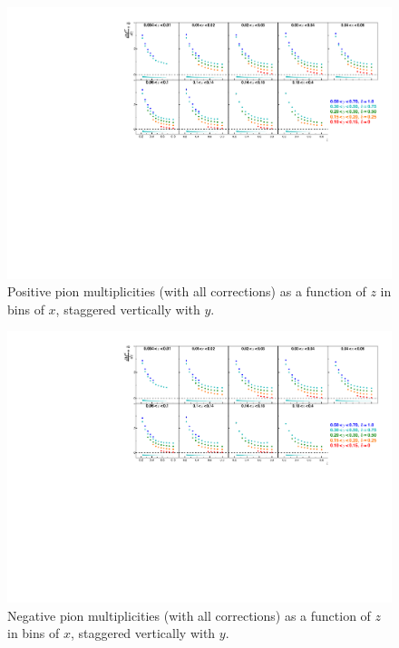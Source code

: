 \begin{figure}[!h]
  \centering
	\includegraphics[scale=0.85]{./gfx/pip.pdf}
	\caption{Positive pion multiplicities (with all corrections) as a function of $z$ in bins of $x$, staggered vertically with $y$.}
	\label{pic:mpip}
\end{figure}

\newpage

\begin{figure}[!h]
  \centering
	\includegraphics[scale=0.85]{./gfx/pim.pdf}
	\caption{Negative pion multiplicities (with all corrections) as a function of $z$ in bins of $x$, staggered vertically with $y$.}
	\label{pic:mpim}
\end{figure}

